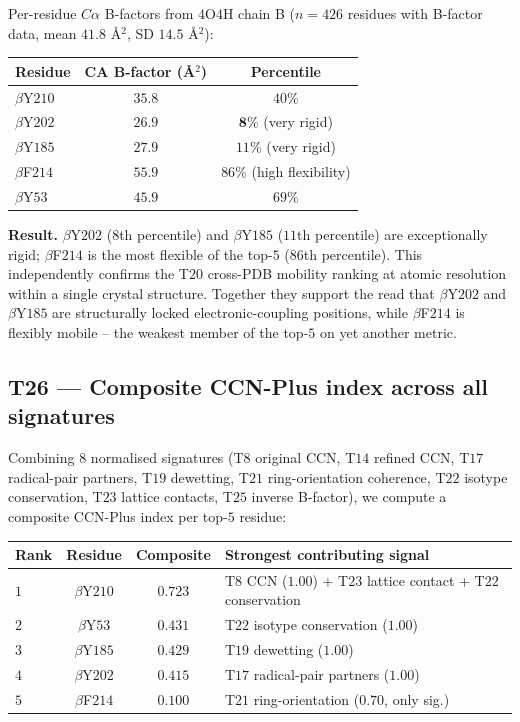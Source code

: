 \documentclass[11pt,a4paper]{article}
\begin{document}
Per-residue $C\alpha$ B-factors from $4$O$4$H chain B
($n = 426$ residues with B-factor data, mean $41.8$ \AA$^2$,
SD $14.5$ \AA$^2$):

\begin{center}
\begin{tabular}{lcc}\toprule
Residue & CA B-factor (\AA$^2$) & Percentile \\\midrule
$\beta$Y$210$ & $35.8$ & $40\%$ \\
$\beta$Y$202$ & $\mathbf{26.9}$ & $\mathbf{8\%}$ (very rigid) \\
$\beta$Y$185$ & $27.9$ & $11\%$ (very rigid) \\
$\beta$F$214$ & $55.9$ & $86\%$ (high flexibility) \\
$\beta$Y$53$  & $45.9$ & $69\%$ \\
\bottomrule\end{tabular}
\end{center}

\textbf{Result.} $\beta$Y$202$ ($8$th percentile) and $\beta$Y$185$
($11$th percentile) are exceptionally rigid; $\beta$F$214$ is the most
flexible of the top-$5$ ($86$th percentile). This independently
confirms the T$20$ cross-PDB mobility ranking at atomic resolution
within a single crystal structure. Together they support the read
that $\beta$Y$202$ and $\beta$Y$185$ are structurally locked
electronic-coupling positions, while $\beta$F$214$ is flexibly mobile
-- the weakest member of the top-$5$ on yet another metric.

\subsection{\textsf{T26} --- Composite CCN-Plus index across all signatures}\label{ssec:t26}

Combining $8$ normalised signatures (T$8$ original CCN, T$14$ refined
CCN, T$17$ radical-pair partners, T$19$ dewetting, T$21$ ring-orientation
coherence, T$22$ isotype conservation, T$23$ lattice contacts, T$25$
inverse B-factor), we compute a composite CCN-Plus index per top-$5$
residue:

\begin{center}
\begin{tabular}{lccl}\toprule
Rank & Residue & Composite & Strongest contributing signal \\\midrule
$1$ & $\beta$Y$210$ & $\mathbf{0.723}$ & T$8$ CCN ($1.00$) + T$23$ lattice contact + T$22$ conservation \\
$2$ & $\beta$Y$53$  & $0.431$ & T$22$ isotype conservation ($1.00$) \\
$3$ & $\beta$Y$185$ & $0.429$ & T$19$ dewetting ($1.00$) \\
$4$ & $\beta$Y$202$ & $0.415$ & T$17$ radical-pair partners ($1.00$) \\
$5$ & $\beta$F$214$ & $0.100$ & T$21$ ring-orientation ($0.70$, only sig.) \\
\bottomrule\end{tabular}
\end{center}
\end{document}
